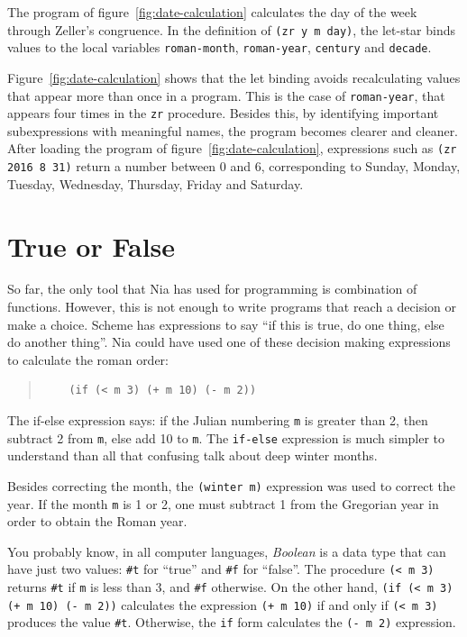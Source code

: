 \documentclass[a4paper,12pt]{book}
\begin{document}
The program of figure~\ref{fig:date-calculation}
calculates the day of the week
through Zeller's congruence. In the definition
of \verb|(zr y m day)|, the let-star 
binds values to the local variables \verb|roman-month|,
\verb|roman-year|, \verb|century| and \verb|decade|.

Figure~\ref{fig:date-calculation} shows that
the let binding avoids recalculating values that
appear more than once in a program. This
is the case of \verb|roman-year|, that
appears four times in the \verb|zr| procedure.
Besides this, by identifying important
subexpressions with meaningful names, the
program becomes clearer and cleaner.
After loading the program of
figure~\ref{fig:date-calculation},
expressions
such as
\verb|(zr 2016 8 31)| return
a number between 0 and 6, corresponding to
Sunday, Monday, Tuesday, Wednesday,
Thursday, Friday and Saturday.

\section{True or False}
So far, the only tool that Nia has used
for programming is combination of functions.
However, this is not enough to write
programs that reach a decision or
make a choice. Scheme has expressions
to say ``if this is true, do one thing,
else do another thing''. Nia 
could have used one of these decision
making expressions to calculate the roman
order:
\begin{quote}
	\begin{verbatim}
	(if (< m 3) (+ m 10) (- m 2))
	\end{verbatim}
\end{quote}
The if-else expression says: if the
Julian numbering \verb|m| is greater
than 2, then subtract 2 from \verb|m|,
else add 10 to \verb|m|. The \verb|if-else|
expression is much simpler to understand
than all that confusing talk about deep
winter months.

Besides correcting the month, the \verb|(winter m)|
expression was used to correct the year. If
the month \verb|m| is 1 or 2, one must subtract
1 from the Gregorian year in order to obtain
the Roman year.

You probably know, in all computer
languages, {\em Boolean} is a data type
that can have just two values: \verb|#t|
for ``true'' and \verb|#f| for ``false''.
The procedure \verb|(< m 3)| returns
\verb|#t| if \verb|m| is less than 3,
and \verb|#f| otherwise. On the other
hand, \verb|(if (< m 3) (+ m 10) (- m 2))|
calculates the expression \verb|(+ m 10)|
if and only if \verb|(< m 3)| produces
the value \verb|#t|. Otherwise, the
\verb|if| form calculates the \verb|(- m 2)|
expression.
\end{document}
